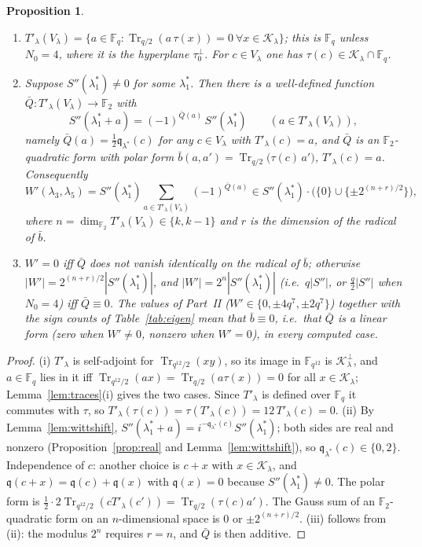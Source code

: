 ﻿\documentclass[12pt,a4paper]{amsart}
\newtheorem{proposition}[theorem]{Proposition}
\theoremstyle{definition}
\newcommand{\F}{\mathbb{F}}
\newcommand{\Tr}{\operatorname{Tr}}
\newcommand{\Kk}{\mathcal{K}}
\newcommand{\qq}{\mathfrak{q}}
\newcommand{\Spp}{S''}
\begin{document}
\begin{proposition}\label{prop:phase}
\begin{enumerate}[label=\textup{(\roman*)},leftmargin=2em]
\item $T'_\lambda(V_\lambda)=\{a\in\F_q:\Tr_{q/2}(a\,\tau(x))=0\ \forall x\in\Kk_\lambda\}$; this is $\F_q$ unless $N_0=4$, where it is the hyperplane $\tau_0^\perp$. For $c\in V_\lambda$ one has $\tau(c)\in\Kk_\lambda\cap\F_q$.
\item Suppose $\Spp(\lambda_1^*)\ne0$ for some $\lambda_1^*$. Then there is a well-defined function $\bar Q:T'_\lambda(V_\lambda)\to\F_2$ with
\[
\Spp(\lambda_1^*+a)=(-1)^{\bar Q(a)}\,\Spp(\lambda_1^*)\qquad(a\in T'_\lambda(V_\lambda)),
\]
namely $\bar Q(a)=\frac12\qq_{\lambda^*}(c)$ for any $c\in V_\lambda$ with $T'_\lambda(c)=a$, and $\bar Q$ is an $\F_2$-quadratic form with polar form $\bar b(a,a')=\Tr_{q/2}\bigl(\tau(c)\,a'\bigr)$, $T'_\lambda(c)=a$. Consequently
\[
W'(\lambda_3,\lambda_5)=\Spp(\lambda_1^*)\sum_{a\in T'_\lambda(V_\lambda)}(-1)^{\bar Q(a)}\in\Spp(\lambda_1^*)\cdot\bigl(\{0\}\cup\{\pm2^{(n+r)/2}\}\bigr),
\]
where $n=\dim_{\F_2}T'_\lambda(V_\lambda)\in\{k,k-1\}$ and $r$ is the dimension of the radical of $\bar b$.
\item $W'=0$ iff $\bar Q$ does not vanish identically on the radical of $\bar b$; otherwise $|W'|=2^{(n+r)/2}|\Spp(\lambda_1^*)|$, and $|W'|=2^n|\Spp(\lambda_1^*)|$ (i.e.\ $q|\Spp|$, or $\frac q2|\Spp|$ when $N_0=4$) iff $\bar Q\equiv0$. The values of Part~II ($W'\in\{0,\pm4q^7,\pm2q^7\}$) together with the sign counts of Table~\ref{tab:eigen} mean that $\bar b\equiv0$, i.e.\ that $\bar Q$ is a linear form (zero when $W'\ne0$, nonzero when $W'=0$), in every computed case.
\end{enumerate}
\end{proposition}
\begin{proof}
(i) $T'_\lambda$ is self-adjoint for $\Tr_{q^{12}/2}(xy)$, so its image in $\F_{q^{12}}$ is $\Kk_\lambda^\perp$, and $a\in\F_q$ lies in it iff $\Tr_{q^{12}/2}(ax)=\Tr_{q/2}(a\tau(x))=0$ for all $x\in\Kk_\lambda$; Lemma~\ref{lem:traces}(i) gives the two cases. Since $T'_\lambda$ is defined over $\F_q$ it commutes with $\tau$, so $T'_\lambda(\tau(c))=\tau(T'_\lambda(c))=12\,T'_\lambda(c)=0$. (ii) By Lemma~\ref{lem:wittshift}, $\Spp(\lambda_1^*+a)=i^{-\qq_{\lambda^*}(c)}\Spp(\lambda_1^*)$; both sides are real and nonzero (Proposition~\ref{prop:real} and Lemma~\ref{lem:wittshift}), so $\qq_{\lambda^*}(c)\in\{0,2\}$. Independence of $c$: another choice is $c+x$ with $x\in\Kk_\lambda$, and $\qq(c+x)=\qq(c)+\qq(x)$ with $\qq(x)=0$ because $\Spp(\lambda_1^*)\ne0$. The polar form is $\frac12\cdot2\Tr_{q^{12}/2}(cT'_\lambda(c'))=\Tr_{q/2}(\tau(c)a')$. The Gauss sum of an $\F_2$-quadratic form on an $n$-dimensional space is $0$ or $\pm2^{(n+r)/2}$. (iii) follows from (ii): the modulus $2^n$ requires $r=n$, and $\bar Q$ is then additive.
\end{proof}
\end{document}
